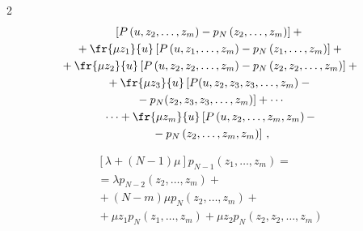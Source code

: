 \begin{multicols}{2}
\begin{multline}
\left[P\left(u,z_2,\ldots,z_{m}\right) - p_{N}\left(z_2,\ldots,z_{m}\right)\right] +{}\\


{}+


\fr{\mu z_1}{u}\left[P\left(u,z_1,\ldots,z_{m}\right) - p_{N}\left(z_1,\ldots,z_{m}\right)\right]


+{}


\\


{}+ \fr{\mu z_2}{u}\left[P\left(u,z_2,z_2,\ldots,z_{m}\right)


- p_{N}\left(z_2,z_2,\ldots,z_{m}\right)\right]+{}


\\


{}+


\fr{\mu z_3}{u}\left[P(u,z_2,z_3,z_3,\ldots,z_{m}) -{}\right.\\


\left.{}-


p_{N}(z_2,z_3,z_3,\ldots,z_{m})\right]+\cdots{}


\\


{} \cdots + \fr{\mu z_m}{u}\left[P\left(u,z_2,\ldots,z_{m},z_m\right)-\right.\\


\left.{}-p_{N}\left(z_2,\ldots,z_{m},z_m\right)\right]\,,


\end{multline}





\vspace*{-12pt}





\noindent


\begin{multline}


\label{bat-z-3}


\left[\lambda+(N-1)\mu\right] p_{N-1}\left(z_1,\ldots,z_{m}\right)={}\\


{}=


\lambda p_{N-2}\left(z_2,\ldots,z_{m}\right)+{}\\


{}+(N-m) \mu p_{N}\left(z_2,\ldots,z_{m}\right)


+{}


\\


{}+ \mu z_1 p_{N}\left(z_1,\ldots,z_{m}\right) + \mu z_2 p_{N}\left(z_2,z_2,\ldots,z_{m}\right)



\end{multline}
\end{multicols}
